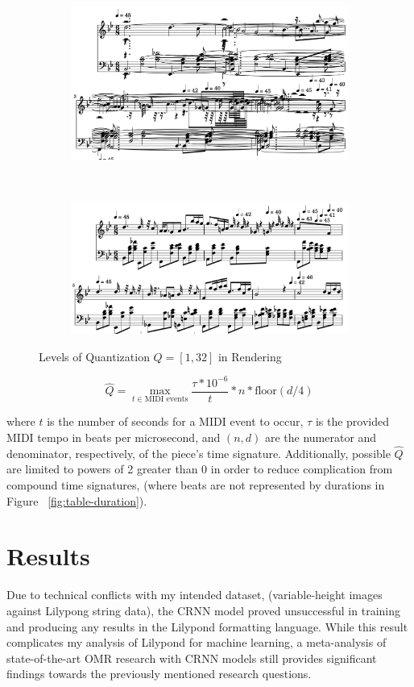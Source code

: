 \documentclass[sigconf]{acmart}
\begin{document}
\begin{figure}
	\centering
	\begin{subfigure}
		\centering
		\includegraphics[width = .8\linewidth]{./figures/c1.png}
	\end{subfigure}
	~
	\begin{subfigure}
		\centering
		\includegraphics[width = .8\linewidth]{./figures/c32.png}
	\end{subfigure}
	\caption{Levels of Quantization $Q = [1, 32]$ in Rendering}
	\label{fig:quantization}
\end{figure}

\begin{equation}
	\hat Q = \max_{t\in \text{MIDI events}} \frac{\tau * 10^{-6}}{t} * n * \text{floor}(d / 4)
\end{equation}

where $t$ is the number of seconds for a MIDI event to occur, $\tau$ is the provided MIDI tempo in beats per microsecond, and $(n, d)$ are the numerator and denominator, respectively, of the piece's time signature.
Additionally, possible $\hat Q$ are limited to powers of 2 greater than 0 in order to reduce complication from compound time signatures, (where beats are not represented by durations in Figure ~\ref{fig:table-duration}).


\section{Results}
Due to technical conflicts with my intended dataset, (variable-height images against Lilypong string data),
 the CRNN model proved unsuccessful in training and producing any results in the Lilypond formatting language.
While this result complicates my analysis of Lilypond for machine learning, a meta-analysis of state-of-the-art OMR research with CRNN models still provides significant findings towards the previously mentioned research questions.  
\end{document}
